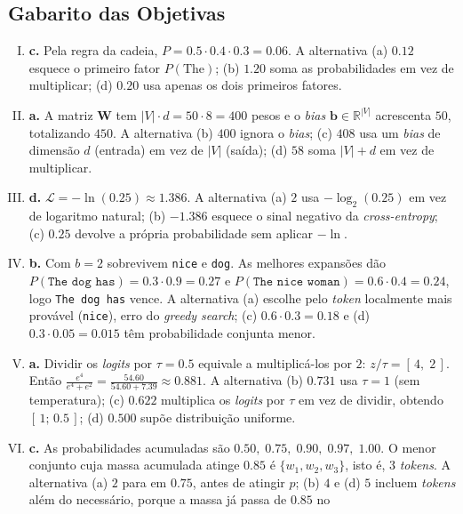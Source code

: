 \documentclass{dlproblemset}
\begin{document}
\subsection*{Gabarito das Objetivas}
\color{blue}
\begin{enumerate}[I)]
    \item \textbf{c.} Pela regra da cadeia, $P = 0.5 \cdot 0.4 \cdot 0.3 = 0.06$. A
    alternativa (a) $0.12$ esquece o primeiro fator $P(\text{The})$; (b) $1.20$ soma as
    probabilidades em vez de multiplicar; (d) $0.20$ usa apenas os dois primeiros fatores.
    \item \textbf{a.} A matriz $\mathbf{W}$ tem $|V| \cdot d = 50 \cdot 8 = 400$ pesos e o \textit{bias}
    $\mathbf{b} \in \mathbb{R}^{|V|}$ acrescenta $50$, totalizando $450$. A alternativa (b) $400$ ignora o
    \textit{bias}; (c) $408$ usa um \textit{bias} de dimensão $d$ (entrada) em vez de $|V|$
    (saída); (d) $58$ soma $|V| + d$ em vez de multiplicar.
    \item \textbf{d.} $\mathcal{L} = -\ln(0.25) \approx 1.386$. A alternativa (a) $2$ usa
    $-\log_2(0.25)$ em vez de logaritmo natural; (b) $-1.386$ esquece o sinal negativo da
    \textit{cross-entropy}; (c) $0.25$ devolve a própria probabilidade sem aplicar $-\ln$.
    \item \textbf{b.} Com $b = 2$ sobrevivem \texttt{nice} e \texttt{dog}. As melhores expansões
    dão $P(\texttt{The dog has}) = 0.3 \cdot 0.9 = 0.27$ e
    $P(\texttt{The nice woman}) = 0.6 \cdot 0.4 = 0.24$, logo \texttt{The dog has} vence. A
    alternativa (a) escolhe pelo \textit{token} localmente mais provável (\texttt{nice}), erro do
    \textit{greedy search}; (c) $0.6 \cdot 0.3 = 0.18$ e (d) $0.3 \cdot 0.05 = 0.015$
    têm probabilidade conjunta menor.
    \item \textbf{a.} Dividir os \textit{logits} por $\tau = 0.5$ equivale a multiplicá-los por
    $2$: $z/\tau = [\,4,\; 2\,]$. Então
    $\frac{e^{4}}{e^{4} + e^{2}} = \frac{54.60}{54.60 + 7.39} \approx 0.881$. A
    alternativa (b) $0.731$ usa $\tau = 1$ (sem temperatura); (c) $0.622$ multiplica os
    \textit{logits} por $\tau$ em vez de dividir, obtendo $[\,1;\, 0.5\,]$; (d) $0.500$
    supõe distribuição uniforme.
    \item \textbf{c.} As probabilidades acumuladas são $0.50,\; 0.75,\; 0.90,\; 0.97,\;
    1.00$. O menor conjunto cuja massa acumulada atinge $0.85$ é $\{w_1, w_2, w_3\}$, isto é,
    $3$ \textit{tokens}. A alternativa (a) $2$ para em $0.75$, antes de atingir $p$; (b) $4$ e
    (d) $5$ incluem \textit{tokens} além do necessário, porque a massa já passa de $0.85$ no

\end{enumerate}
\end{document}
